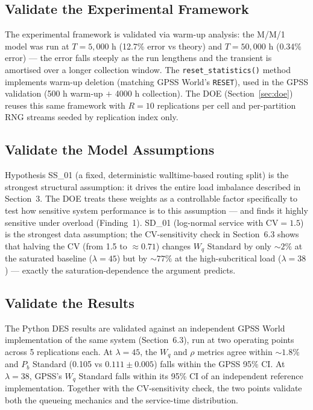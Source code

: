 \documentclass[11pt,a4paper]{article}
\newcommand{\Wq}{\ensuremath{W_q}}
\newcommand{\Pb}{\ensuremath{P_b}}
\newcommand{\lam}{\ensuremath{\lambda}}
\begin{document}
\subsection{Validate the Experimental Framework}

The experimental framework is validated via warm-up analysis: the M/M/1 model was run at
$T=5{,}000$ h (12.7\% error vs theory) and $T=50{,}000$ h (0.34\% error) --- the error falls steeply as
the run lengthens and the transient is amortised over a longer collection window. The \texttt{reset\_statistics()} method implements
warm-up deletion (matching GPSS World's \texttt{RESET}), used in the GPSS validation (500 h warm-up
$+$ 4000 h collection). The DOE (Section~\ref{sec:doe}) reuses this same framework with $R=10$
replications per cell and per-partition RNG streams seeded by replication index only.

\subsection{Validate the Model Assumptions}

Hypothesis SS\_01 (a fixed, deterministic walltime-based routing split) is the strongest structural
assumption: it drives the entire load imbalance described in Section~3. The DOE treats these weights
as a controllable factor specifically to test how sensitive system performance is to this assumption
--- and finds it highly sensitive under overload (Finding~1). SD\_01 (log-normal service with CV$=1.5$)
is the strongest data assumption; the CV-sensitivity check in Section~6.3 shows that halving the CV
(from 1.5 to ${\approx}0.71$) changes $\Wq$ Standard by only ${\sim}2\%$ at the saturated baseline
($\lam=45$) but by ${\sim}77\%$ at the high-subcritical load ($\lam=38$) --- exactly the
saturation-dependence the argument predicts.

\subsection{Validate the Results}

The Python DES results are validated against an independent GPSS World implementation of the same
system (Section~6.3), run at two operating points across 5 replications each. At $\lam=45$, the $\Wq$
and $\rho$ metrics agree within ${\sim}1.8\%$ and $\Pb$ Standard (0.105 vs $0.111 \pm 0.005$) falls
within the GPSS 95\% CI. At $\lam=38$, GPSS's $\Wq$ Standard falls within its 95\% CI of
an independent reference implementation. Together with the CV-sensitivity check, the two points validate
both the queueing mechanics and the service-time distribution.
\end{document}
